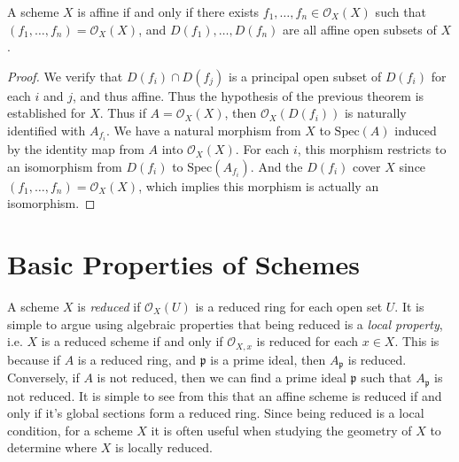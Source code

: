 \begin{corollary}
    A scheme $X$ is affine if and only if there exists $f_1,\dots,f_n \in \mathcal{O}_X(X)$ such that $(f_1,\dots,f_n) = \mathcal{O}_X(X)$, and $D(f_1), \dots, D(f_n)$ are all affine open subsets of $X$.
\end{corollary}
\begin{proof}
    We verify that $D(f_i) \cap D(f_j)$ is a principal open subset of $D(f_i)$ for each $i$ and $j$, and thus affine. Thus the hypothesis of the previous theorem is established for $X$. Thus if $A = \mathcal{O}_X(X)$, then $\mathcal{O}_X(D(f_i))$ is naturally identified with $A_{f_i}$. We have a natural morphism from $X$ to $\text{Spec}(A)$ induced by the identity map from $A$ into $\mathcal{O}_X(X)$. For each $i$, this morphism restricts to an isomorphism from $D(f_i)$ to $\text{Spec}(A_{f_i})$. And the $D(f_i)$ cover $X$ since $(f_1,\dots,f_n) = \mathcal{O}_X(X)$, which implies this morphism is actually an isomorphism.
\end{proof}



















\section{Basic Properties of Schemes}

A scheme $X$ is \emph{reduced} if $\mathcal{O}_X(U)$ is a reduced ring for each open set $U$. It is simple to argue using algebraic properties that being reduced is a \emph{local property}, i.e. $X$ is a reduced scheme if and only if $\mathcal{O}_{X,x}$ is reduced for each $x \in X$. This is because if $A$ is a reduced ring, and $\mathfrak{p}$ is a prime ideal, then $A_{\mathfrak{p}}$ is reduced. Conversely, if $A$ is not reduced, then we can find a prime ideal $\mathfrak{p}$ such that $A_{\mathfrak{p}}$ is not reduced. It is simple to see from this that an affine scheme is reduced if and only if it's global sections form a reduced ring. Since being reduced is a local condition, for a scheme $X$ it is often useful when studying the geometry of $X$ to determine where $X$ is locally reduced.

